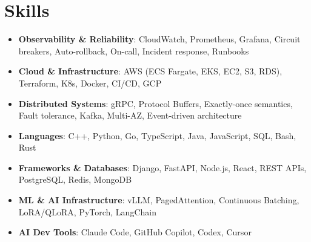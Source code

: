 \documentclass[letterpaper,11pt]{article}
\newcommand{\resumeSubHeadingListStart}{\begin{itemize}[leftmargin=0.15in, label={}]}
\newcommand{\resumeSubHeadingListEnd}{\end{itemize}}
\newcommand{\resumeSkillHeading}[2]{%
  \item\small{\textbf{#1}: #2 \vspace{-9pt}}%
}
\begin{document}
\section{Skills}
  \resumeSubHeadingListStart
    \resumeSkillHeading{Observability \& Reliability}{CloudWatch, Prometheus, Grafana, Circuit breakers, Auto-rollback, On-call, Incident response, Runbooks}
    \resumeSkillHeading{Cloud \& Infrastructure}{AWS (ECS Fargate, EKS, EC2, S3, RDS), Terraform, K8s, Docker, CI/CD, GCP}
    \resumeSkillHeading{Distributed Systems}{gRPC, Protocol Buffers, Exactly-once semantics, Fault tolerance, Kafka, Multi-AZ, Event-driven architecture}
    \resumeSkillHeading{Languages}{C++, Python, Go, TypeScript, Java, JavaScript, SQL, Bash, Rust}
    \resumeSkillHeading{Frameworks \& Databases}{Django, FastAPI, Node.js, React, REST APIs, PostgreSQL, Redis, MongoDB}
    \resumeSkillHeading{ML \& AI Infrastructure}{vLLM, PagedAttention, Continuous Batching, LoRA/QLoRA, PyTorch, LangChain}
    \resumeSkillHeading{AI Dev Tools}{Claude Code, GitHub Copilot, Codex, Cursor}
  \resumeSubHeadingListEnd
\end{document}
